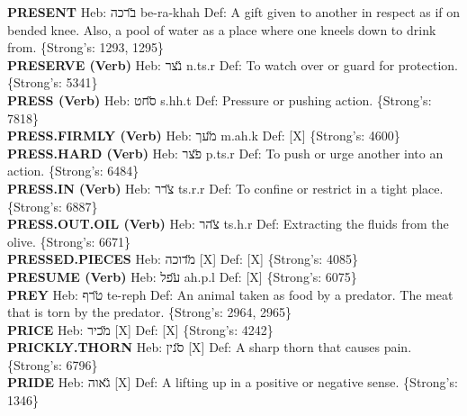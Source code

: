 {\textbf{PRESENT} Heb: {\large\H ברכה} be-ra-khah Def: A gift given to another in respect as if on bended knee. Also, a pool of water as a place where one kneels down to drink from. \{Strong's: 1293, 1295\}\hfill{}\\

\textbf{PRESERVE (Verb)} Heb: {\large\H נצר} n.ts.r Def: To watch over or guard for protection. \{Strong's: 5341\}\hfill{}\\

\textbf{PRESS (Verb)} Heb: {\large\H סחט} s.hh.t Def: Pressure or pushing action. \{Strong's: 7818\}\hfill{}\\

\textbf{PRESS.FIRMLY (Verb)} Heb: {\large\H מעך} m.ah.k Def: {[}X{]} \{Strong's: 4600\}\hfill{}\\

\textbf{PRESS.HARD (Verb)} Heb: {\large\H פצר} p.ts.r Def: To push or urge another into an action. \{Strong's: 6484\}\hfill{}\\

\textbf{PRESS.IN (Verb)} Heb: {\large\H צרר} ts.r.r Def: To confine or restrict in a tight place. \{Strong's: 6887\}\hfill{}\\

\textbf{PRESS.OUT.OIL (Verb)} Heb: {\large\H צהר} ts.h.r Def: Extracting the fluids from the olive. \{Strong's: 6671\}\hfill{}\\

\textbf{PRESSED.PIECES} Heb: {\large\H מדוכה} {[}X{]} Def: {[}X{]} \{Strong's: 4085\}\hfill{}\\

\textbf{PRESUME (Verb)} Heb: {\large\H עפל} ah.p.l Def: {[}X{]} \{Strong's: 6075\}\hfill{}\\

\textbf{PREY} Heb: {\large\H טרף} te-reph Def: An animal taken as food by a predator. The meat that is torn by the predator. \{Strong's: 2964, 2965\}\hfill{}\\

\textbf{PRICE} Heb: {\large\H מכיר} {[}X{]} Def: {[}X{]} \{Strong's: 4242\}\hfill{}\\

\textbf{PRICKLY.THORN} Heb: {\large\H סנין} {[}X{]} Def: A sharp thorn that causes pain. \{Strong's: 6796\}\hfill{}\\

\textbf{PRIDE} Heb: {\large\H גאוה} {[}X{]} Def: A lifting up in a positive or negative sense. \{Strong's: 1346\}\hfill{}\\

}
